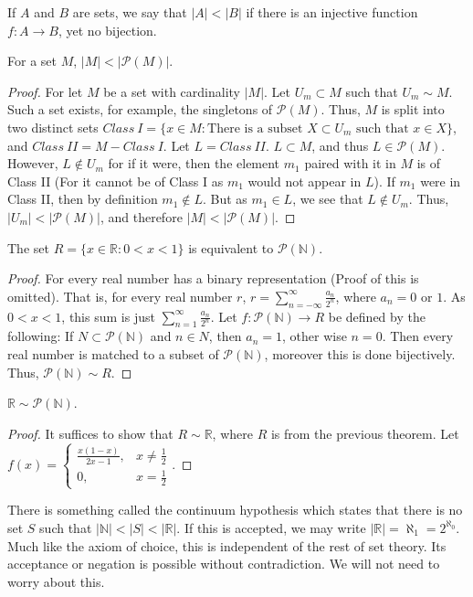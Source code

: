 \documentclass[crop=false,class=article,oneside]{standalone}
\begin{document}
        \begin{definition}
        If $A$ and $B$ are sets, we say that $|A|<|B|$ if there is an injective function $f:A\rightarrow B$, yet no bijection.
        \end{definition}
        \begin{theorem}
        For a set $M$, $|M|<|\mathcal{P}(M)|$.
        \end{theorem}
        \begin{proof}
        For let $M$ be a set with cardinality $|M|$. Let $U_m \subset M$ such that $U_m \sim M$. Such a set exists, for example, the singletons of $\mathcal{P}(M)$. Thus, $M$ is split into two distinct sets $Class\ I=\{x\in M: \textrm{There is a subset } X\subset U_m\textrm{ such that }x\in X\}$, and $Class\ II=M-Class\ I$. Let $L = Class\ II$. $L\subset M$, and thus $L\in \mathcal{P}(M)$. However, $L \notin U_m$ for if it were, then the element $m_1$ paired with it in $M$ is of Class II (For it cannot be of Class I as $m_1$ would not appear in $L$). If $m_1$ were in Class II, then by definition $m_1 \notin L$. But as $m_1 \in L$, we see that $L\notin U_m$. Thus, $|U_m| <|\mathcal{P}(M)|$, and therefore $|M|<|\mathcal{P}(M)|$.
        \end{proof}
        \begin{theorem}
        The set $R=\{x\in \mathbb{R}:0<x<1\}$ is equivalent to $\mathcal{P}(\mathbb{N})$.
        \end{theorem}
        \begin{proof}
        For every real number has a binary representation (Proof of this is omitted). That is, for every real number $r$, $ r = \sum_{n=-\infty}^{\infty} \frac{a_n}{2^n}$, where $a_n = 0$ or $1$. As $0<x<1$, this sum is just $\sum_{n=1}^{\infty} \frac{a_n}{2^n}$. Let $f:\mathcal{P}(\mathbb{N})\rightarrow R$ be defined by the following: If $N\subset \mathcal{P}(\mathbb{N})$ and $n\in N$, then $a_n = 1$, other wise $n=0$. Then every real number is matched to a subset of $\mathcal{P}(\mathbb{N})$, moreover this is done bijectively. Thus, $\mathcal{P}(\mathbb{N})\sim R$.
        \end{proof}
        \begin{theorem}
        $\mathbb{R} \sim \mathcal{P}(\mathbb{N})$.
        \end{theorem}
        \begin{proof}
        It suffices to show that $R\sim \mathbb{R}$, where $R$ is from the previous theorem. Let $f(x) = \begin{cases} \frac{x(1-x)}{2x-1}, & x \ne \frac{1}{2} \\ 0, & x = \frac{1}{2}\end{cases}$.
        \end{proof}
        \begin{remark}
        There is something called the continuum hypothesis which states that there is no set $S$ such that $|\mathbb{N}| < |S| < |\mathbb{R}|$. If this is accepted, we may write $|\mathbb{R}| = \aleph_1 = 2^{\aleph_0}$. Much like the axiom of choice, this is independent of the rest of set theory. Its acceptance or negation is possible without contradiction. We will not need to worry about this.
        \end{remark}
\end{document}

